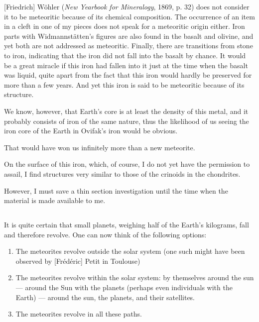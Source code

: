 \documentclass[a4paper, 12pt, oneside]{article}
\begin{document}
[Friedrich] Wöhler (\emph{New Yearbook for Mineralogy}, 1869, p. 32) does not consider it to be meteoritic because of its chemical composition. The occurrence of an item in a cleft in one of my pieces does not speak for a meteoritic origin either. Iron parts with Widmannstätten's figures are also found in the basalt and olivine, and yet both are not addressed as meteoritic. Finally, there are transitions from stone to iron, indicating that the iron did not fall into the basalt by chance. It would be a great miracle if this iron had fallen into it just at the time when the basalt was liquid, quite apart from the fact that this iron would hardly be preserved for more than a few years. And yet this iron is said to be meteoritic because of its structure.

We know, however, that Earth's core is at least the density of this metal, and it probably consists of iron of the same nature, thus the likelihood of us seeing the iron core of the Earth in Ovifak's iron would be obvious.

That would have won us infinitely more than a new meteorite.

On the surface of this iron, which, of course, I do not yet have the permission to assail, I find structures very similar to those of the crinoids in the chondrites.

However, I must save a thin section investigation until the time when the material is made available to me.
\clearpage
\subsection{}
\subsection{}
\paragraph*{}
It is quite certain that small planets, weighing half of the Earth's kilograms, fall and therefore revolve. One can now think of the following options:
\begin{enumerate}
    \item The meteorites revolve outside the solar system (one such might have been observed by [Frédéric] Petit in Toulouse)
    \item The meteorites revolve within the solar system: by themselves around the sun --- around the Sun with the planets (perhaps even individuals with the Earth) --- around the sun, the planets, and their satellites.
    \item The meteorites revolve in all these paths.
\end{enumerate}
\end{document}
